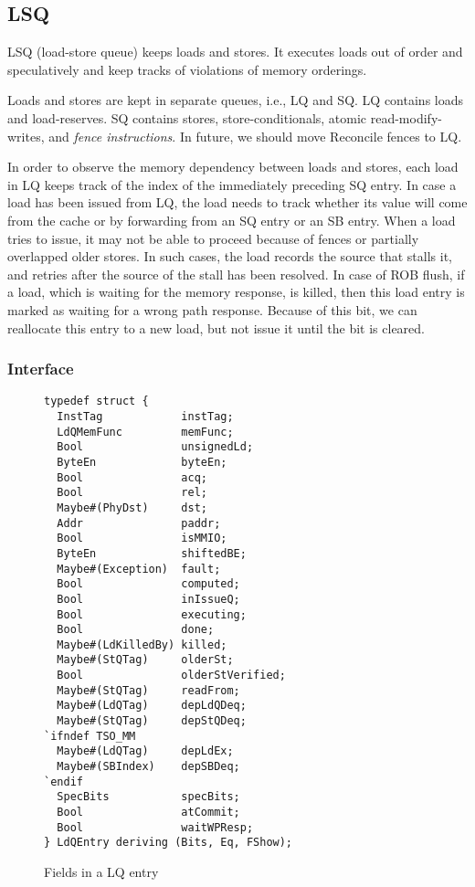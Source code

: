 \subsection{LSQ}\label{sec:lsq}

LSQ (load-store queue) keeps loads and stores.
It executes loads out of order and speculatively and keep tracks of violations of memory orderings.

Loads and stores are kept in separate queues, i.e., LQ and SQ.
LQ contains loads and load-reserves.
SQ contains stores, store-conditionals, atomic read-modify-writes, and \emph{fence instructions}.
In future, we should move Reconcile fences to LQ.

In order to observe the memory dependency between loads and stores, each load in LQ keeps track of the index of the immediately preceding SQ entry.
In case a load has been issued from LQ, the load needs to track whether its value will come from the cache or by forwarding from an SQ entry or an SB entry.
When a load tries to issue, it may not be able to proceed because of fences or partially overlapped older stores.
In such cases, the load records the source that stalls it, and retries after the source of the stall has been resolved.
In case of ROB flush, if a load, which is waiting for the memory response, is killed, then this load entry is marked as waiting for a wrong path response.
Because of this bit, we can reallocate this entry to a new load, but not issue it until the bit is cleared.

\subsubsection{Interface}

\begin{figure}
\begin{lstlisting}[caption={}]
typedef struct {
  InstTag            instTag;
  LdQMemFunc         memFunc;
  Bool               unsignedLd;
  ByteEn             byteEn;
  Bool               acq;
  Bool               rel;
  Maybe#(PhyDst)     dst;
  Addr               paddr;
  Bool               isMMIO;
  ByteEn             shiftedBE;
  Maybe#(Exception)  fault;
  Bool               computed;
  Bool               inIssueQ;
  Bool               executing;
  Bool               done;
  Maybe#(LdKilledBy) killed;
  Maybe#(StQTag)     olderSt;
  Bool               olderStVerified;
  Maybe#(StQTag)     readFrom;
  Maybe#(LdQTag)     depLdQDeq;
  Maybe#(StQTag)     depStQDeq;
`ifndef TSO_MM
  Maybe#(LdQTag)     depLdEx;
  Maybe#(SBIndex)    depSBDeq;
`endif
  SpecBits           specBits;
  Bool               atCommit;
  Bool               waitWPResp;
} LdQEntry deriving (Bits, Eq, FShow);
\end{lstlisting}
\caption{Fields in a LQ entry}\label{fig:lq-entry}
\end{figure}

